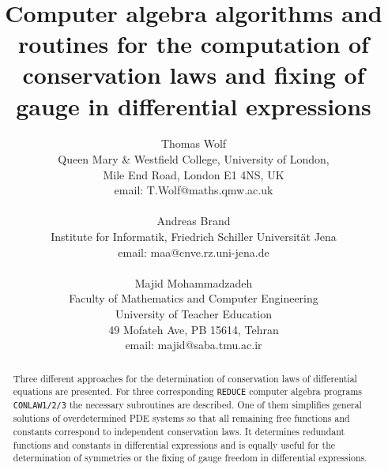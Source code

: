 \topmargin -25mm %
\textheight 25.5cm



\title{\mbox{\quad} \\ \mbox{\quad} \\  \mbox{\quad} \\  \mbox{\quad} \\
       Computer algebra algorithms and routines for the
       computation of conservation laws and fixing of gauge
       in differential expressions}

\author{Thomas Wolf\\ Queen Mary \& Westfield College, University of London, \\
     Mile End Road, London E1 4NS, UK \\  email: T.Wolf@maths.qmw.ac.uk \\ \\
     Andreas Brand\\ Institute for Informatik, Friedrich Schiller
     Universit\"{a}t Jena\\ email: maa@cnve.rz.uni-jena.de \\ \\
     Majid Mohammadzadeh \\ Faculty of Mathematics and Computer
     Engineering \\ University of Teacher Education \\
     49 Mofateh Ave, PB 15614, Tehran \\
     email: majid@saba.tmu.ac.ir
     }


\maketitle
\begin{abstract}
Three different approaches for the determination of conservation
laws of differential equations are presented.
For three corresponding {\tt REDUCE} computer algebra programs
{\tt CONLAW1/2/3} the necessary subroutines
are described. One of them simplifies general solutions of overdetermined
PDE systems so that all remaining free functions and constants
correspond to independent conservation laws.
It determines redundant functions and constants in differential expressions
and is equally useful for the determination of symmetries or the
fixing of gauge freedom in differential expressions.
\end{abstract}


